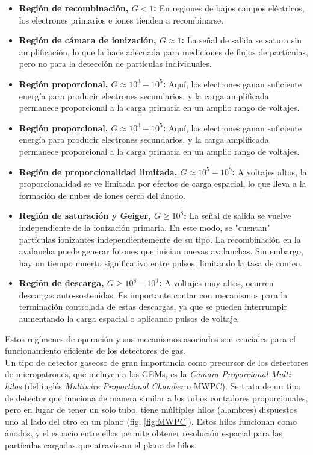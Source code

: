\documentclass{article}
\begin{document}
\begin{itemize}
    \item \textbf{Región de recombinación, \(G < 1\):} En regiones de bajos campos eléctricos, los electrones primarios e iones tienden a recombinarse.
    \item \textbf{Región de cámara de ionización, \(G \approx 1\):} La señal de salida se satura sin amplificación, lo que la hace adecuada para mediciones de flujos de partículas, pero no para la detección de partículas individuales.
    \item \textbf{Región proporcional, \(G \approx 10^3 - 10^5\):} Aquí, los electrones ganan suficiente energía para producir electrones secundarios, y la carga amplificada permanece proporcional a la carga primaria en un amplio rango de voltajes.
    \item \textbf{Región proporcional, \(G \approx 10^3 - 10^5\):} Aquí, los electrones ganan suficiente energía para producir electrones secundarios, y la carga amplificada permanece proporcional a la carga primaria en un amplio rango de voltajes.
    \item \textbf{Región de proporcionalidad limitada, \(G \approx 10^5 - 10^8\):} A voltajes altos, la proporcionalidad se ve limitada por efectos de carga espacial, lo que lleva a la formación de nubes de iones cerca del ánodo.
    \item \textbf{Región de saturación y Geiger, \(G \geq 10^8\):} La señal de salida se vuelve independiente de la ionización primaria. En este modo, se "cuentan" partículas ionizantes independientemente de su tipo. La recombinación en la avalancha puede generar fotones que inician nuevas avalanchas. Sin embargo, hay un tiempo muerto significativo entre pulsos, limitando la tasa de conteo.
    \item \textbf{Región de descarga, \(G \geq 10^8 - 10^9\):} A voltajes muy altos, ocurren descargas auto-sostenidas. Es importante contar con mecanismos para la terminación controlada de estas descargas, ya que se pueden interrumpir aumentando la carga espacial o aplicando pulsos de voltaje.
\end{itemize}

\noindent Estos regímenes de operación y sus mecanismos asociados son cruciales para el funcionamiento eficiente de los detectores de gas.\\

\noindent Un tipo de detector gaseoso de gran importancia como precursor de los detectores de micropatrones, que incluyen a los GEMs, es la \textit{Cámara Proporcional Multi-hilos} (del inglés \textit{Multiwire Proportional Chamber} o MWPC). Se trata de un tipo de detector que funciona de manera similar a los tubos contadores proporcionales, pero en lugar de tener un solo tubo, tiene múltiples hilos (alambres) dispuestos uno al lado del otro en un plano (fig. \ref{fig:MWPC}). Estos hilos funcionan como ánodos, y el espacio entre ellos permite obtener resolución espacial para las partículas cargadas que atraviesan el plano de hilos.
\end{document}

